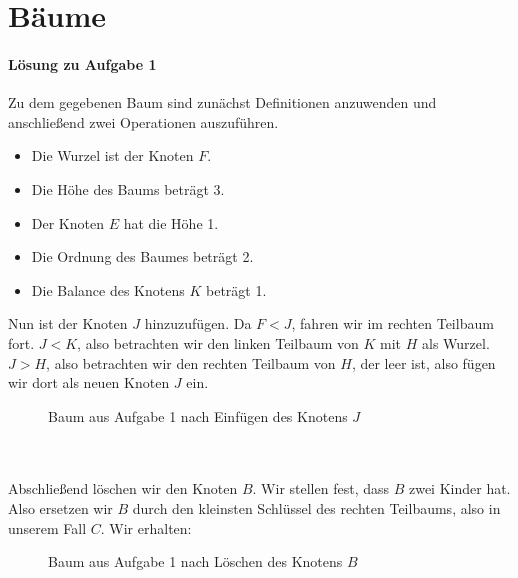 \documentclass[11pt,a4paper]{scrartcl}
\begin{document}
\section{Bäume}
\paragraph{Lösung zu Aufgabe 1}
\label{a4.1:lsg}
Zu dem gegebenen Baum sind zunächst Definitionen anzuwenden und anschließend zwei Operationen auszuführen.
\begin{itemize}
\item Die Wurzel ist der Knoten $F$.
\item Die Höhe des Baums beträgt 3.
\item Der Knoten $E$ hat die Höhe 1.
\item Die Ordnung des Baumes beträgt 2.
\item Die Balance des Knotens $K$ beträgt 1.
\end{itemize}
Nun ist der Knoten $J$ hinzuzufügen. Da $F < J$, fahren wir im rechten Teilbaum fort. $J < K$, also betrachten wir den linken Teilbaum von $K$ mit $H$ als Wurzel. $J > H$, also betrachten wir den rechten Teilbaum von $H$, der leer ist, also fügen wir dort als neuen Knoten $J$ ein.
\begin{figure}[h]
\centering
{}
\caption{Baum aus Aufgabe 1 nach Einfügen des Knotens $J$}
\end{figure} \\\\
Abschließend löschen wir den Knoten $B$. Wir stellen fest, dass $B$ zwei Kinder hat. Also ersetzen wir $B$ durch den kleinsten Schlüssel des rechten Teilbaums, also in unserem Fall $C$. Wir erhalten:
\begin{figure}[h]
\centering
{}
\caption{Baum aus Aufgabe 1 nach Löschen des Knotens $B$}
\end{figure}
\end{document}
